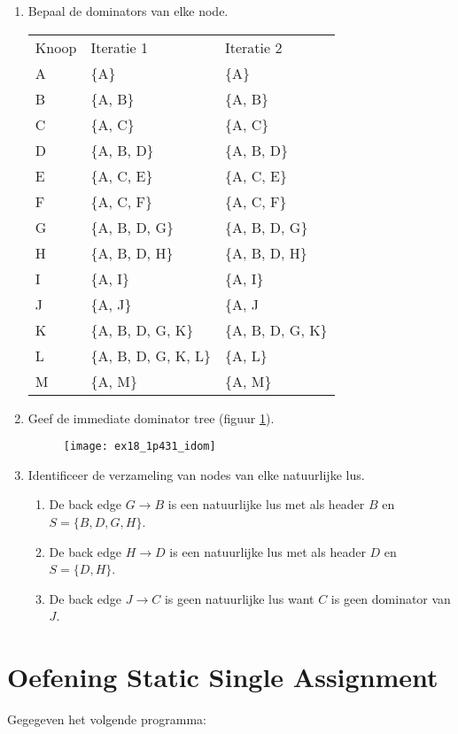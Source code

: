 \begin{enumerate}
	\item Bepaal de dominators van elke node.
	\begin{table}[ht]
		\centering
		\begin{tabular}{l | l | l}
			Knoop & Iteratie 1 & Iteratie 2 \\
			A & \{A\} & \{A\} \\
			B & \{A, B\} & \{A, B\} \\
			C & \{A, C\} & \{A, C\} \\
			D & \{A, B, D\} & \{A, B, D\} \\
			E & \{A, C, E\} & \{A, C, E\} \\
			F & \{A, C, F\} & \{A, C, F\} \\
			G & \{A, B, D, G\}&\{A, B, D, G\} \\
			H & \{A, B, D, H\}&\{A, B, D, H\} \\
			I & \{A, I\}& \{A, I\}\\
			J & \{A, J\}& \{A, J\\
			K & \{A, B, D, G, K\}& \{A, B, D, G, K\}\\
			L & \{A, B, D, G, K, L\}& \{A, L\}\\
			M & \{A, M\}&\{A, M\} \\
		\end{tabular}
	\end{table}
	\item Geef de immediate dominator tree (figuur \ref{fig:ex18_1p431_idom}).
	\begin{figure}[ht]
		\centering
		\texttt{[image: ex18\_1p431\_idom]}
		\caption{}
		\label{fig:ex18_1p431_idom}
	\end{figure}
	\item Identificeer de verzameling van nodes van elke natuurlijke lus.
	\begin{enumerate}
		\item De back edge $G \rightarrow B$ is een natuurlijke lus met als header $B$ en $S = \{B, D, G, H\}$.
		\item De back edge $H \rightarrow D$ is een natuurlijke lus met als header $D$ en $S = \{D, H\}$.
		\item De back edge $J \rightarrow C$ is geen natuurlijke lus want $C$ is geen dominator van $J$.
	\end{enumerate}
\end{enumerate}

\section{Oefening Static Single Assignment}
Gegegeven het volgende programma:

